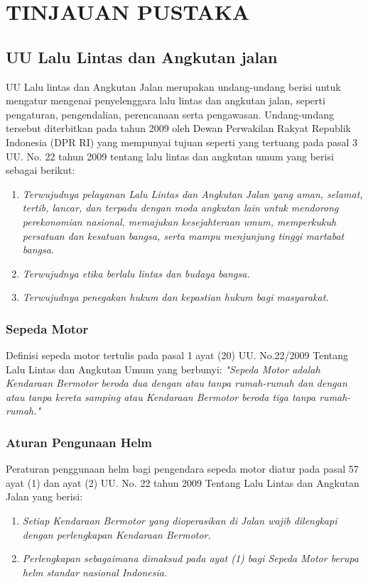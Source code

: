 \section{TINJAUAN PUSTAKA}


\subsection{UU Lalu Lintas dan Angkutan jalan}
\label{sec:uulalulintas}
UU Lalu lintas dan Angkutan Jalan merupakan undang-undang berisi untuk mengatur
mengenai penyelenggara lalu lintas dan angkutan jalan, seperti pengaturan, pengendalian, perencanaan serta
pengawasan. Undang-undang tersebut diterbitkan pada tahun 2009 oleh Dewan Perwakilan Rakyat Republik Indonesia (DPR RI) yang mempunyai
tujuan seperti yang tertuang pada pasal 3 UU. No. 22 tahun 2009 tentang lalu lintas dan angkutan umum yang berisi sebagai berikut: \citep{angkutan-jalan}
\begin{enumerate}[nolistsep]
  \item \emph{Terwujudnya pelayanan Lalu Lintas dan Angkutan Jalan yang aman, selamat, tertib, lancar, dan terpadu dengan moda angkutan lain untuk mendorong perekonomian nasional, memajukan kesejahteraan umum, memperkukuh persatuan dan kesatuan bangsa, serta mampu menjunjung tinggi martabat bangsa.}
  \item \emph{Terwujudnya etika berlalu lintas dan budaya bangsa.}
  \item \emph{Terwujudnya penegakan hukum dan kepastian hukum bagi masyarakat.}
\end{enumerate}

\subsubsection{Sepeda Motor}
\label{subsec:sepedamotor}
Definisi sepeda motor tertulis pada pasal 1 ayat (20) UU. No.22/2009 Tentang Lalu
Lintas dan Angkutan Umum yang berbunyi: \emph{"Sepeda Motor adalah Kendaraan Bermotor
beroda dua dengan atau tanpa rumah-rumah dan dengan atau tanpa kereta samping atau
Kendaraan Bermotor beroda tiga tanpa rumah-rumah."}

\subsubsection{Aturan Pengunaan Helm}
\label{subsec:helm}
Peraturan penggunaan helm bagi pengendara sepeda motor diatur pada pasal 57 ayat (1) dan ayat (2) UU. No. 22 tahun 2009
Tentang Lalu Lintas dan Angkutan Jalan yang berisi:
\begin{enumerate}[nolistsep]
  \item \emph{Setiap Kendaraan Bermotor yang dioperasikan di Jalan
  wajib dilengkapi dengan perlengkapan Kendaraan
  Bermotor.} 
  \item \emph{Perlengkapan sebagaimana dimaksud pada ayat (1) bagi
  Sepeda Motor berupa helm standar nasional Indonesia.}
\end{enumerate}

